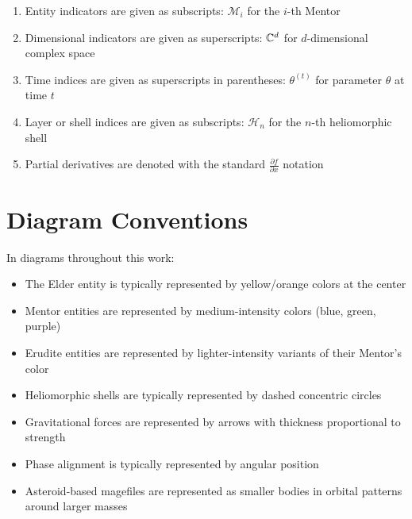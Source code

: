 \begin{enumerate}
    \item Entity indicators are given as subscripts: $\mathcal{M}_i$ for the $i$-th Mentor
    \item Dimensional indicators are given as superscripts: $\mathbb{C}^{d}$ for $d$-dimensional complex space
    \item Time indices are given as superscripts in parentheses: $\theta^{(t)}$ for parameter $\theta$ at time $t$
    \item Layer or shell indices are given as subscripts: $\mathcal{H}_n$ for the $n$-th heliomorphic shell
    \item Partial derivatives are denoted with the standard $\frac{\partial f}{\partial x}$ notation
\end{enumerate}

\section*{Diagram Conventions}

In diagrams throughout this work:

\begin{itemize}
    \item The Elder entity is typically represented by yellow/orange colors at the center
    \item Mentor entities are represented by medium-intensity colors (blue, green, purple)
    \item Erudite entities are represented by lighter-intensity variants of their Mentor's color
    \item Heliomorphic shells are typically represented by dashed concentric circles
    \item Gravitational forces are represented by arrows with thickness proportional to strength
    \item Phase alignment is typically represented by angular position
    \item Asteroid-based magefiles are represented as smaller bodies in orbital patterns around larger masses
\end{itemize}